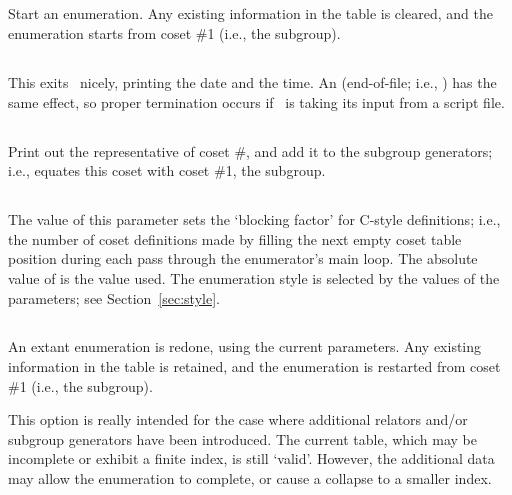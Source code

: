 \subsection{}

Start an enumeration.
Any existing information in the table is cleared, and the enumeration
  starts from coset \#1 (i.e., the subgroup).

\subsection{}

This exits \ace\ nicely, printing the date and the time.
An  (end-of-file; i.e., ) has the same effect, so 
  proper termination occurs if \ace\ is taking its input from a script
  file.

\subsection{}

Print out the representative of coset \#, and add it to the
  subgroup generators; i.e., equates this coset with coset \#1, the
  subgroup.

\subsection{}

The value of this parameter sets the `blocking factor' for C-style
  definitions; i.e., the number of coset definitions made by filling the
  next empty coset table position during each pass through the enumerator's
  main loop.
The absolute value of  is the value used.
The enumeration style is selected by the values of the  \amp
   parameters; see Section~\ref{sec:style}.

\subsection{}

An extant enumeration is redone, using the current parameters.
Any existing information in the table is retained, and the enumeration
  is restarted from coset \#1 (i.e., the subgroup).

This option is really intended for the case where additional relators
  and/or subgroup generators have been introduced.
The current table, which may be incomplete or exhibit a finite index, is
  still `valid'\kern-1.5pt.
However, the additional data may allow the enumeration to complete, or
  cause a collapse to a smaller index.

